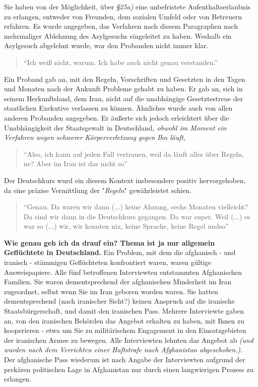 Sie haben von der Möglichkeit, über \textit{§25a)} eine unbefristete Aufenthaltserlaubnis zu erlangen,  entweder von Freunden, dem sozialen Umfeld oder von Betreuern erfahren. Es wurde angegeben, das Verfahren nach diesem Paragraphen nach mehrmaliger Ablehnung des Asylgesuchs eingeleitet zu haben. 
Weshalb ein Asylgesuch abgelehnt wurde, war den Probanden nicht immer klar.
\begin{quote}
    ``Ich weiß nicht, warum. Ich habe auch nicht genau verstanden.''
\end{quote}
Ein Proband gab an, mit den Regeln, Vorschriften und Gesetzten in den Tagen und Monaten nach der Ankunft Probleme gehabt zu haben. Er gab an, sich in seinem Herkunftsland, dem Iran, nicht auf die unabhängige Gesetztestreue der staatlichen Exekutive verlassen zu können. Ähnliches wurde auch von allen anderen Probanden angegeben. Er äußerte sich jedoch erleichtert über die Unabhängigkeit der Staatsgewalt in Deutschland\textit{, obwohl im Moment ein Verfahren wegen schwerer Körperverletzung gegen Ihn läuft},
\begin{quote}
    ``Also, ich kann auf jeden Fall vertrauen, weil da läuft alles über Regeln, ne? Aber im Iran ist das nicht so''
\end{quote}
Der Deutschkurs wurd ein diesem Kontext insbesondere positiv hervorgehoben, da eine präzise Vermittlung der "\textit{Regeln}" gewährleistet schien.
\begin{quote}
    ``Genau. Da waren wir dann (...) keine Ahnung, sechs Monaten vielleicht? Da sind wir dann in die Deutschkurs gegangen. Da war super. Weil (...) es war so (...) wir, wir konnten nix, keine Sprache, keine Regel undso''
\end{quote}
\textbf{Wie genau geh ich da drauf ein? Thema ist ja nur allgemein Geflüchtete in Deutschland.}
Ein Problem, mit dem die afghanisch - und iranisch - stämmigen Geflüchteten konfrontiert waren, waren gültige Ausweispapiere.\newline
Alle fünf betroffenen Interviewten entstammten Afghanischen Familien. Sie waren dementsprechend der afghanischen Minderheit im Iran zugeordnet, selbst wenn Sie im Iran geboren worden waren. Sie hatten dementsprechend (nach iranischer Sicht?) keinen Anspruch auf die iranische Staatsbürgerschaft, und damit den iranischen Pass.\newline
Mehrere Interviewte gaben an, von den iranischen Behörden das Angebot erhalten zu haben, mit Ihnen zu kooperieren - etwa um Sie zu militärischem Engagement in den Einsatzgebieten der iranischen Armee zu bewegen. Alle Interviewten lehnten das Angebot ab \textit{(und wurden nach dem Verrichten einer Haftstrafe nach Afghanistan abgeschoben.)}. 
Der afghanische Pass wiederum ist nach Angabe der Interviewten aufgrund der prekären politischen Lage in Afghanistan nur durch einen langwierigen Prozess zu erlangen.\newline


